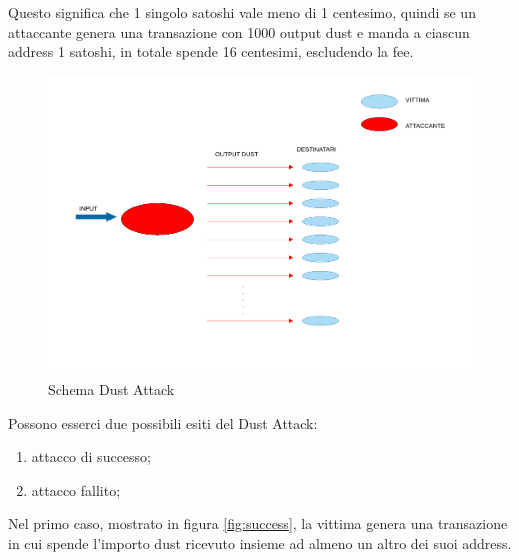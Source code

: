 Questo significa che 1 singolo satoshi vale meno di 1 centesimo, quindi se un attaccante genera una transazione con 1000 output dust e manda a ciascun address 1 satoshi, in totale spende 16 centesimi, escludendo la fee.   
\begin{figure}[h!]
    \centering
    \includegraphics[scale=0.5, trim = 1cm 5cm 0cm 0cm, clip]{Images/dust_attack.pdf}
    \caption{Schema Dust Attack}
    \label{fig:Dust_attack}
\end{figure}
\FloatBarrier
Possono esserci due possibili esiti del Dust Attack: 
    \begin{enumerate}
        \item attacco di successo;
        \item attacco fallito;
    \end{enumerate}
    
Nel primo caso, mostrato in figura \ref{fig:success}, la vittima genera una transazione in cui spende l'importo dust ricevuto insieme ad almeno un altro dei suoi address. 

